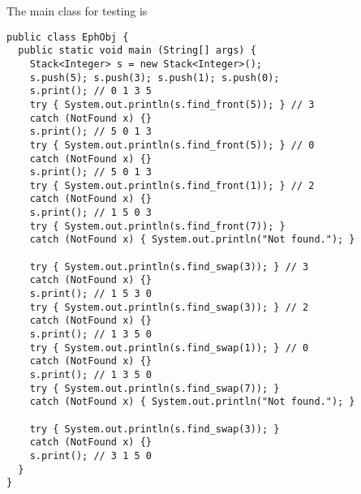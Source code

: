 \documentclass[11pt,a4paper]{article}
\begin{document}
\noindent The main class for testing is
\begin{verbatim}
public class EphObj {
  public static void main (String[] args) {
    Stack<Integer> s = new Stack<Integer>();
    s.push(5); s.push(3); s.push(1); s.push(0);
    s.print(); // 0 1 3 5
    try { System.out.println(s.find_front(5)); } // 3
    catch (NotFound x) {}
    s.print(); // 5 0 1 3
    try { System.out.println(s.find_front(5)); } // 0
    catch (NotFound x) {}
    s.print(); // 5 0 1 3
    try { System.out.println(s.find_front(1)); } // 2
    catch (NotFound x) {}
    s.print(); // 1 5 0 3
    try { System.out.println(s.find_front(7)); }
    catch (NotFound x) { System.out.println("Not found."); }

    try { System.out.println(s.find_swap(3)); } // 3
    catch (NotFound x) {}
    s.print(); // 1 5 3 0
    try { System.out.println(s.find_swap(3)); } // 2
    catch (NotFound x) {}
    s.print(); // 1 3 5 0
    try { System.out.println(s.find_swap(1)); } // 0
    catch (NotFound x) {}
    s.print(); // 1 3 5 0
    try { System.out.println(s.find_swap(7)); }
    catch (NotFound x) { System.out.println("Not found."); }

    try { System.out.println(s.find_swap(3)); }
    catch (NotFound x) {}
    s.print(); // 3 1 5 0
  }
}
\end{verbatim}
\end{document}
